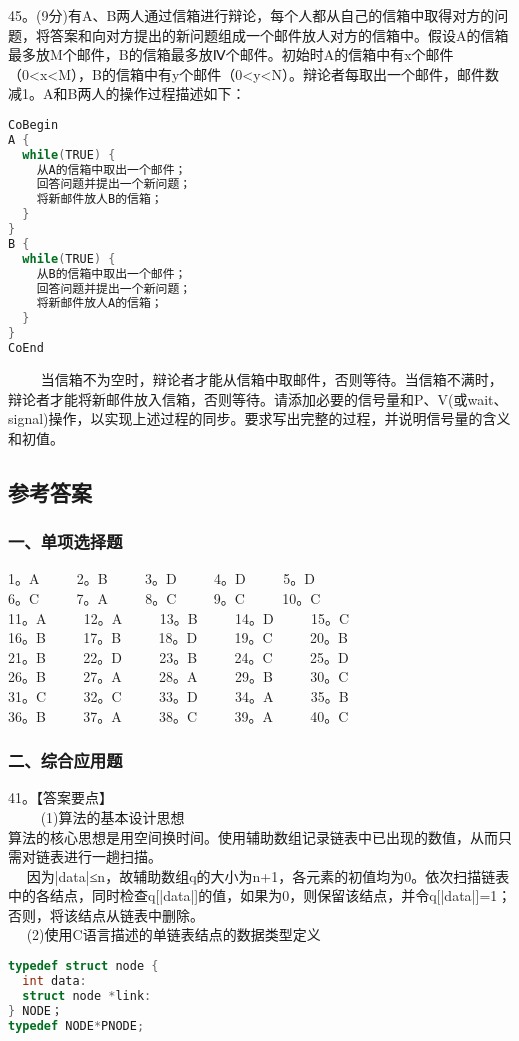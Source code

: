 45。(9分)有A、B两人通过信箱进行辩论，每个人都从自己的信箱中取得对方的问题，将答案和向对方提出的新问题组成一个邮件放人对方的信箱中。假设A的信箱最多放M个邮件，B的信箱最多放Ⅳ个邮件。初始时A的信箱中有x个邮件（0<x<M），B的信箱中有y个邮件（0<y<N）。辩论者每取出一个邮件，邮件数减1。A和B两人的操作过程描述如下： \\
\begin{lstlisting}[language=cpp]
CoBegin
A {
  while(TRUE) {
    从A的信箱中取出一个邮件；
    回答问题并提出一个新问题；
    将新邮件放人B的信箱；
  }
}
B {
  while(TRUE) {
    从B的信箱中取出一个邮件；
    回答问题并提出一个新问题；
    将新邮件放人A的信箱；
  }
}
CoEnd
\end{lstlisting}
$\qquad$ 当信箱不为空时，辩论者才能从信箱中取邮件，否则等待。当信箱不满时，辩论者才能将新邮件放入信箱，否则等待。请添加必要的信号量和P、V(或wait、signal)操作，以实现上述过程的同步。要求写出完整的过程，并说明信号量的含义和初值。


\subsection{参考答案}
\subsubsection{一、单项选择题}
1。A $\qquad$ 2。B $\qquad$ 3。D $\qquad$ 4。D $\qquad$ 5。D \\
6。C $\qquad$ 7。A $\qquad$ 8。C $\qquad$ 9。C $\qquad$ 10。C \\
11。A $\qquad$ 12。A $\qquad$ 13。B $\qquad$ 14。D $\qquad$ 15。C \\
16。B $\qquad$ 17。B $\qquad$ 18。D $\qquad$ 19。C $\qquad$ 20。B \\
21。B $\qquad$ 22。D $\qquad$ 23。B $\qquad$ 24。C $\qquad$ 25。D \\
26。B $\qquad$ 27。A $\qquad$ 28。A $\qquad$ 29。B $\qquad$ 30。C \\
31。C $\qquad$ 32。C $\qquad$ 33。D $\qquad$ 34。A $\qquad$ 35。B \\
36。B $\qquad$ 37。A $\qquad$ 38。C $\qquad$ 39。A $\qquad$ 40。C

\subsubsection{二、综合应用题}

41。【答案要点】 \\
$\qquad$ (1)算法的基本设计思想 \\
算法的核心思想是用空间换时间。使用辅助数组记录链表中已出现的数值，从而只需对链表进行一趟扫描。 \\
$\quad$ 因为|data|≤n，故辅助数组q的大小为n+1，各元素的初值均为0。依次扫描链表中的各结点，同时检查q[|data|]的值，如果为0，则保留该结点，并令q[|data|]=1；否则，将该结点从链表中删除。 \\
$\quad$ (2)使用C语言描述的单链表结点的数据类型定义 \\
\begin{lstlisting}[language=cpp]
typedef struct node {
  int data:
  struct node *link:
} NODE；
typedef NODE*PNODE;
\end{lstlisting}

